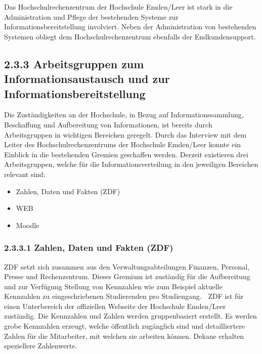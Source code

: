 \documentclass[a4paper]{article}
\newcommand\liststyleLii{%
\renewcommand\labelitemi{•}
\renewcommand\labelitemii{◦}
\renewcommand\labelitemiii{${\blacksquare}$}
\renewcommand\labelitemiv{•}
}
\begin{document}
\bigskip

{\sffamily\mdseries\color{black}
Das Hochschulrechenzentrum der Hochschule Emden/Leer ist stark in die Administration und Pflege der bestehenden Systeme
zur Informationsbereitstellung involviert. Neben der Administration von bestehenden Systemen obliegt dem
Hochschulrechenzentrum ebenfalls der Endkundensupport. }

\subsection[2.3.3 Arbeitsgruppen zum Informationsaustausch und zur Informationsbereitstellung]{\bfseries 2.3.3
Arbeitsgruppen zum Informationsaustausch und zur Informationsbereitstellung}
{\sffamily\mdseries\color{black}
Die Zuständigkeiten an der Hochschule, in Bezug auf Informationssammlung, Beschaffung und Aufbereitung von
Informationen, ist bereits durch Arbeitsgruppen in wichtigen Bereichen geregelt. Durch das Interview mit dem Leiter des
Hochschulrechenzentrums der Hochschule Emden/Leer konnte ein Einblick in die bestehenden Gremien geschaffen werden.
Derzeit existieren drei Arbeitsgruppen, welche für die Informationsverteilung in den jeweiligen Bereichen relevant
sind:}


\bigskip

\liststyleLii
\begin{itemize}
\item {\sffamily\color{black}
Zahlen, Daten und Fakten (ZDF)}
\item {\sffamily\color{black}
WEB}
\item {\sffamily\color{black}
Moodle}
\end{itemize}
\subsubsection{2.3.3.1 Zahlen, Daten und Fakten (ZDF)}
{\sffamily\mdseries\color{black}
ZDF setzt sich zusammen aus den Verwaltungsabteilungen Finanzen, Personal, Presse und Rechenzentrum. Dieses Gremium ist
zuständig für die Aufbereitung und zur Verfügung Stellung von Kennzahlen wie zum Beispiel aktuelle Kennzahlen zu
eingeschriebenen Studierenden pro Studiengang. \textbf{\textcolor[rgb]{0.9843137,0.0,0.02745098}{\ }}ZDF ist für einen
Unterbereich der offiziellen Webseite der Hochschule Emden/Leer zuständig. Die Kennzahlen und Zahlen werden
gruppenbasiert erstellt. Es werden grobe Kennzahlen erzeugt, welche öffentlich zugänglich sind und detailliertere
Zahlen für die Mitarbeiter, mit welchen sie arbeiten können. Dekane erhalten speziellere Zahlenwerte.}
\end{document}
